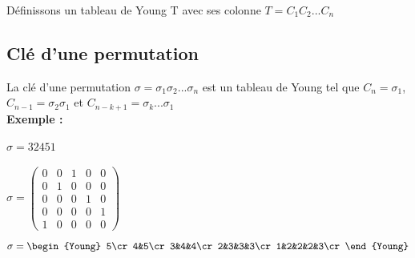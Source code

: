 \documentclass{book}
\begin{document}
  Définissons un tableau de Young T avec ses colonne $T = C_1C_2...C_n$
  \subsection{Clé d'une permutation}
  La clé d'une permutation $\sigma = \sigma_1\sigma_2...\sigma_n $ est un tableau de Young  tel que $C_n = \sigma_1$, $C_{n-1}=\sigma_2\sigma_1$ et $C_{n-k+1}=\sigma_k...\sigma_1$\\
  
  \textbf{Exemple : }\\\\
$\sigma = 32451$ \\ \\

$\sigma = \begin{pmatrix}
0&0&1&0&0\\0&1&0&0&0\\0&0&0&1&0\\0&0&0&0&1\\1&0&0&0&0
\end{pmatrix}$  
  
  $
\sigma = \begin{Young}
5\cr
4&5\cr
3&4&4\cr
2&3&3&3\cr
1&2&2&2&3\cr
\end{Young}  
  $ \\\\
\end{document}
